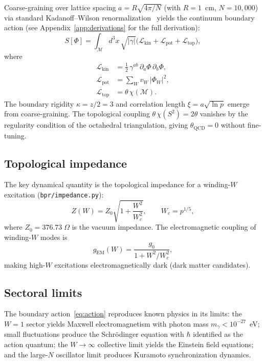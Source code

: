 \documentclass[aps,prd,twocolumn,superscriptaddress,longbibliography,nofootinbib]{revtex4-2}
\newcommand{\Stwo}{S^2}
\newcommand{\Wc}{W_{\!c}}
\newcommand{\Zimp}{Z}
\newcommand{\Zvac}{Z_0}
\begin{document}
Coarse-graining over lattice spacing $a = R\sqrt{4\pi/N}$ (with $R = 1$~cm,
$N = 10{,}000$) via standard Kadanoff--Wilson renormalization~\cite{Wilson1971}
yields the continuum boundary action (see Appendix~\ref{app:derivations} for
the full derivation):
\begin{equation}
S[\Phi] = \int_{\mathcal{M}} d^3x\,\sqrt{|\gamma|}
  \bigl(\mathcal{L}_{\mathrm{kin}} +
         \mathcal{L}_{\mathrm{pot}} +
         \mathcal{L}_{\mathrm{top}}\bigr),
\label{eq:action}
\end{equation}
where
\begin{align}
\mathcal{L}_{\mathrm{kin}} &= \tfrac{1}{2}\,\gamma^{ab}\,
  \partial_a\Phi\,\partial_b\Phi, \\
\mathcal{L}_{\mathrm{pot}} &= \sum_W v_W\,|\Phi_W|^2, \\
\mathcal{L}_{\mathrm{top}} &= \theta\,\chi(\mathcal{M}).
\end{align}
The boundary rigidity $\kappa = z/2 = 3$ and correlation length
$\xi = a\sqrt{\ln p}$ emerge from coarse-graining.  The topological coupling
$\theta\,\chi(\Stwo) = 2\theta$ vanishes by the regularity condition of the
octahedral triangulation, giving $\theta_{\mathrm{QCD}} = 0$ without fine-tuning.

\subsection{Topological impedance}

The key dynamical quantity is the topological impedance for a winding-$W$
excitation (\texttt{bpr/impedance.py}):
\begin{equation}
\Zimp(W) = \Zvac\sqrt{1 + \frac{W^2}{\Wc^2}},
\qquad \Wc = p^{1/5},
\label{eq:impedance}
\end{equation}
where $\Zvac = 376.73\;\Omega$ is the vacuum impedance.
The electromagnetic coupling of winding-$W$ modes is
\begin{equation}
g_{\mathrm{EM}}(W) = \frac{g_0}{1 + W^2/\Wc^2},
\end{equation}
making high-$W$ excitations electromagnetically dark (dark matter candidates).

\subsection{Sectoral limits}

The boundary action~\eqref{eq:action} reproduces known physics in its limits:
the $W = 1$ sector yields Maxwell electromagnetism with photon mass
$m_\gamma < 10^{-27}$~eV; small fluctuations produce the Schr\"odinger
equation with $\hbar$ identified as the action quantum; the $W \to \infty$
collective limit yields the Einstein field equations; and the large-$N$
oscillator limit produces Kuramoto synchronization dynamics.
\end{document}

